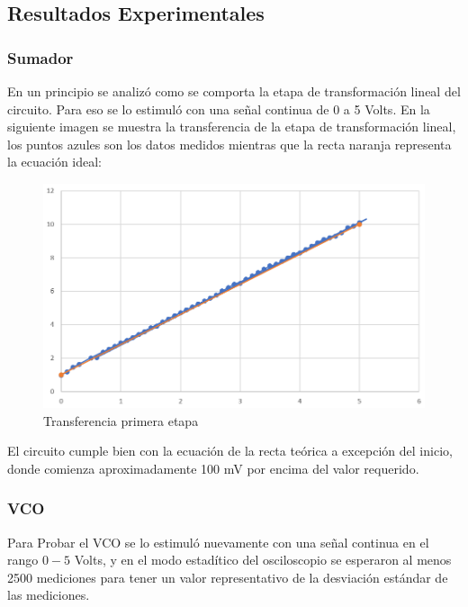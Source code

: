 \subsection{Resultados Experimentales}
\subsubsection{Sumador}
En un principio se analizó como se comporta la etapa de transformación lineal del circuito. Para eso se lo estimuló con una señal continua de 0 a 5 Volts. En la siguiente imagen se muestra la transferencia de la etapa de transformación lineal, los puntos azules son los datos medidos mientras que la recta naranja representa la ecuación ideal:

\begin{figure}[H]	
	\centering
	\includegraphics[width=1\textwidth]{Imagenes_Ej3/linealizacion.png}
	\caption{Transferencia primera etapa}
	\label{fig:linealizacion}
\end{figure}

El circuito cumple bien con la ecuación de la recta teórica a excepción del inicio, donde comienza aproximadamente 100 mV por encima del valor requerido.
\subsubsection{VCO}

Para Probar el VCO se lo estimuló nuevamente con una señal continua en el rango $0-5$ Volts, y en el modo estadítico del osciloscopio se esperaron al menos 2500 mediciones para tener un valor representativo de la desviación estándar de las mediciones. 

